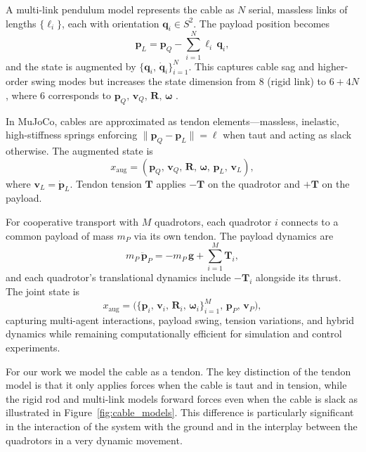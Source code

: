 A multi-link pendulum model represents the cable as \(N\) serial, massless links of lengths \(\{\ell_i\}\), each with orientation \(\mathbf{q}_i\in S^2\). The payload position becomes
\begin{equation}
\mathbf{p}_L = \mathbf{p}_Q - \sum_{i=1}^N \ell_i\,\mathbf{q}_i,
\end{equation}
and the state is augmented by \(\{\mathbf{q}_i,\,\dot{\mathbf{q}}_i\}_{i=1}^N\). This captures cable sag and higher-order swing modes but increases the state dimension from 8 (rigid link) to \(6+4N\), where 6 corresponds to \(\mathbf{p}_Q,\,\mathbf{v}_Q,\,\mathbf{R},\,\boldsymbol{\omega}\) \cite{goodarzi_dynamics_2015}.

In MuJoCo, cables are approximated as tendon elements—massless, inelastic, high-stiffness springs enforcing \(\|\mathbf{p}_Q - \mathbf{p}_L\| = \ell\) when taut and acting as slack otherwise. The augmented state is
\begin{equation}
x_{\mathrm{aug}} = (\mathbf{p}_Q,\,\mathbf{v}_Q,\,\mathbf{R},\,\boldsymbol{\omega},\,\mathbf{p}_L,\,\mathbf{v}_L),
\end{equation}
where \(\mathbf{v}_L = \dot{\mathbf{p}}_L\). Tendon tension \(\mathbf{T}\) applies \(-\mathbf{T}\) on the quadrotor and \(+\mathbf{T}\) on the payload.

For cooperative transport with \(M\) quadrotors, each quadrotor \(i\) connects to a common payload of mass \(m_P\) via its own tendon. The payload dynamics are
\begin{equation}
m_P \,\ddot{\mathbf{p}}_P = -m_P\,\mathbf{g} + \sum_{i=1}^M \mathbf{T}_i,
\end{equation}
and each quadrotor's translational dynamics include \(-\mathbf{T}_i\) alongside its thrust. The joint state is
\begin{equation}
x_{\mathrm{aug}} = \bigl(\{\mathbf{p}_i,\,\mathbf{v}_i,\,\mathbf{R}_i,\,\boldsymbol{\omega}_i\}_{i=1}^M,\,\mathbf{p}_P,\,\mathbf{v}_P\bigr),
\end{equation}
capturing multi-agent interactions, payload swing, tension variations, and hybrid dynamics while remaining computationally efficient for simulation and control experiments.

For our work we model the cable as a tendon. The key distinction of the tendon model is that it only applies forces when the cable is taut and in tension, while the rigid rod and multi-link models forward forces even when the cable is slack as illustrated in Figure~\ref{fig:cable_models}. This difference is particularly significant in the interaction of the system with the ground and in the interplay between the quadrotors in a very dynamic movement.